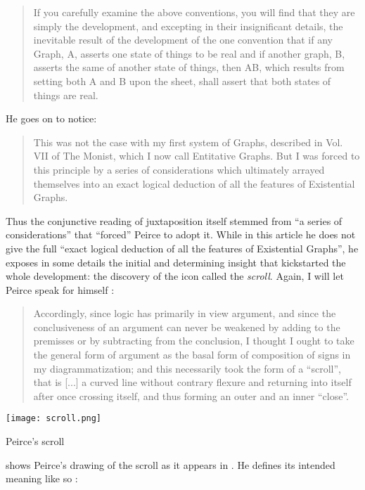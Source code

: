 \begin{quote}
If you carefully examine the above conventions, you will find that they are
simply the development, and excepting in their insignificant details, the
inevitable result of the development of the one convention that if any Graph, A,
asserts one state of things to be real and if another graph, B, asserts the same
of another state of things, then AB, which results from setting both A and B
upon the sheet, shall assert that both states of things are real.
\end{quote}

He goes on to notice:

\begin{quote}
   This was not the case with my first system of Graphs, described in Vol. VII
of The Monist, which I now call Entitative Graphs. But I was forced to this
principle by a series of considerations which ultimately arrayed themselves into
an exact logical deduction of all the features of Existential Graphs.
\end{quote}

Thus the conjunctive reading of juxtaposition itself stemmed from ``a series of
considerations'' that ``forced'' Peirce to adopt it. While in this article he
does not give the full ``exact logical deduction of all the features of
Existential Graphs'', he exposes in some details the initial and determining
insight that kickstarted the whole development: the discovery of the icon called
the \emph{scroll}. Again, I will let Peirce speak for
himself \cite[pp.~533--534]{peirce_prolegomena_1906}:

\begin{quote}
  Accordingly, since logic has primarily in view argument, and since the
conclusiveness of an argument can never be weakened by adding to the premisses
or by subtracting from the conclusion, I thought I ought to take the general
form of argument as the basal form of composition of signs in my
diagrammatization; and this necessarily took the form of a ``scroll'', that is
[...] a curved line without contrary flexure and returning into itself after
once crossing itself, and thus forming an outer and an inner ``close''.
\end{quote}

\begin{marginfigure}
  \texttt{[image: scroll.png]}
  \caption{Peirce's scroll}
\end{marginfigure}

 shows Peirce's drawing of the scroll as it appears in
\cite[Fig.~5]{peirce_prolegomena_1906}. He defines its intended meaning like so
\cite[p.~534--535]{peirce_prolegomena_1906}:


